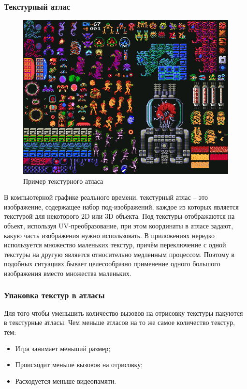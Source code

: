 \documentclass{fefu}
\begin{document}
\subsubsection{Текстурный атлас}
\begin{figure}[H]
    \centering
    \includegraphics[scale=0.6]{images/TextureAtlas.png}
    \caption{Пример текстурного атласа}
\end{figure}
В компьютерной графике реального времени, текстурный атлас -- это изображение, содержащее набор 
под-изображений, каждое из которых является текстурой для некоторого 2D или 3D объекта. Под-текстуры 
отображаются на объект, используя UV-преобразование, при этом координаты в атласе задают, какую часть изображения 
нужно использовать. В приложениях нередко используется множество маленьких текстур, причём переключение с одной 
текстуры на другую является относительно медленным процессом. Поэтому в подобных ситуациях бывает целесообразно 
применение одного большого изображения вместо множества маленьких.
\subsubsection{Упаковка текстур в атласы}
Для того чтобы уменьшить количество вызовов на отрисовку текстуры пакуются в текстурные атласы. Чем меньше атласов на
то же самое количество текстур, тем:
\begin{itemize}
    \item Игра занимает меньший размер;
    \item Происходит меньше вызовов на отрисовку;
    \item Расходуется меньше видеопамяти.
\end{itemize}
\end{document}
